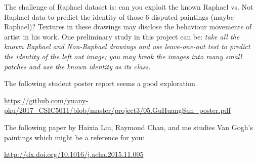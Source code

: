 \documentclass[11pt]{article}
\begin{document}
The challenge of Raphael dataset is: can you exploit the known Raphael vs. Not Raphael data to predict the identity of those 6 disputed paintings (maybe Raphael)? Textures in these drawings may disclose the behaviour movements of artist in his work. One preliminary study in this project can be: \emph{take all the known Raphael and Non-Raphael drawings and use leave-one-out test to predict the identity of the left out image; you may break the images into many small patches and use the known identity as its class.}      

The following student poster report seems a good exploration

\url{https://github.com/yuany-pku/2017_CSIC5011/blob/master/project3/05.GuHuangSun_poster.pdf}

The following paper by Haixia Liu, Raymond Chan, and me studies Van Gogh's paintings which might be a reference for you:

\url{http://dx.doi.org/10.1016/j.acha.2015.11.005}
\end{document}
